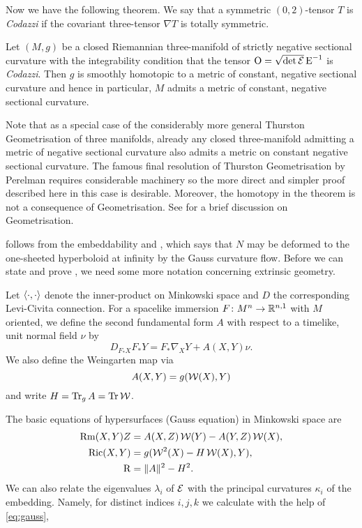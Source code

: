 \documentclass[a4paper,12pt]{amsart}
\begin{document}
Now we have the following theorem. We say that a symmetric \((0,2)\)-tensor \(T\) is \emph{Codazzi} if the covariant three-tensor \(\nabla T\) is totally symmetric.

\begin{thm}
\label{thm:intg_const_curv}

Let \((M, g)\) be a closed Riemannian three-manifold of strictly negative sectional curvature with the integrability condition that the tensor \(\operatorname{O} = \sqrt{\det \operatorname{\mathcal{E}}} \operatorname{E}^{-1}\) is \emph{Codazzi}. Then \(g\) is smoothly homotopic to a metric of constant, negative sectional curvature and hence in particular, \(M\) admits a metric of constant, negative sectional curvature.
\end{thm}

Note that as a special case of the considerably more general Thurston Geometrisation of three manifolds, already any closed three-manifold admitting a metric of negative sectional curvature also admits a metric on constant negative sectional curvature. The famous final resolution of Thurston Geometrisation by Perelman requires considerable machinery so the more direct and simpler proof described here in this case is desirable. Moreover, the homotopy in the theorem is not a consequence of Geometrisation. See  for a brief discussion on Geometrisation.

 follows from the embeddability  and \cite[Theorem 1.1]{MR3344442}, which says that \(N\) may be deformed to the one-sheeted hyperboloid at infinity by the Gauss curvature flow.
Before we can state and prove , we need some more notation concerning extrinsic geometry.

Let \(\left\langle \cdot,\cdot \right\rangle\) denote the inner-product on Minkowski space and \(D\) the corresponding Levi-Civita connection. For a spacelike immersion \(F\colon M^n \to \mathbb{R}^{n,1}\) with \(M\) oriented, we define the second fundamental form $A$ with respect to a timelike, unit normal field $\nu$ by
\[
D_{F_{\ast} X} F_{\ast} Y = F_{\ast} \nabla_X Y + A(X,Y)\nu.
\]
We also define the Weingarten map via
\[
A(X, Y) =  g(\operatorname{\mathcal{W}}(X), Y)
\]
and write $H = \operatorname{Tr}_{g}A = \operatorname{Tr} \operatorname{\mathcal{W}}$.

The basic equations of hypersurfaces (Gauss equation) in Minkowski space are
\begin{equation}
\label{eq:gauss}
\begin{split}
\operatorname{Rm}(X, Y) Z &= A(X, Z) \operatorname{\mathcal{W}}(Y) - A(Y, Z) \operatorname{\mathcal{W}}(X), \\
\operatorname{Ric}(X, Y) &= g(\operatorname{\mathcal{W}}^2(X) - H \operatorname{\mathcal{W}}(X), Y), \\
\operatorname{R} &= \|A\|^2 - H^2.
\end{split}
\end{equation}
We can also relate the eigenvalues $\lambda_{i}$ of $\operatorname{\mathcal{E}}$ with the principal curvatures $\kappa_{i}$ of the embedding. Namely, for distinct indices \(i,j,k\) we calculate with the help of \eqref{eq:gauss},
\end{document}
